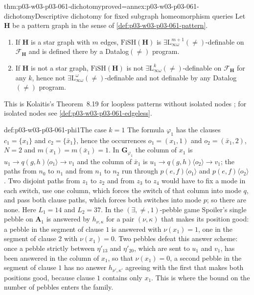 \begin{hbtheorem}{thm:p03-w03-p03-061-dichotomy}{proved=annex:p03-w03-p03-061-dichotomy}{Descriptive dichotomy for fixed subgraph homeomorphism queries}
Let \(\mathbf H\) be a pattern graph in the sense of
\cref{def:p03-w03-p03-061-pattern}.
\begin{enumerate}
\item If \(\mathbf H\) is a star graph with \(m\) edges,
      \(\mathrm{FiSH}(\mathbf H)\) is
      \(\exists\mathrm L^{m+1}_{\infty\omega}(\neq)\)-definable on
      \(\mathcal F_{\mathbf H}\) and is defined there by a Datalog\((\neq)\)
      program.
\item If \(\mathbf H\) is not a star graph, \(\mathrm{FiSH}(\mathbf H)\) is
      not \(\exists\mathrm L^k_{\infty\omega}(\neq)\)-definable on
      \(\mathcal F_{\mathbf H}\) for any \(k\), hence not
      \(\exists\mathrm L^\omega_{\infty\omega}(\neq)\)-definable and not
      definable by any Datalog\((\neq)\) program.
\end{enumerate}
\end{hbtheorem}

This is Kolaitis's Theorem~8.19 for loopless patterns without isolated
nodes \cite[Thm~8.19, p.~79]{Kolaitis2003ExpressivePowerNotes}; for
isolated nodes see \cref{def:p03-w03-p03-061-edgeless}.

\begin{hbexample}{def:p03-w03-p03-061-phi1}{The case \(k=1\)}
The formula \(\varphi_1\) has the clauses \(c_1=\{x_1\}\) and
\(c_2=\{\bar x_1\}\), hence the occurrences \(o_1=(x_1,1)\) and
\(o_2=(\bar x_1,2)\), \(N=2\) and \(m(x_1)=m(\bar x_1)=1\). In
\(\mathbf G_{\varphi_1}\) the column of \(x_1\) is
\(u_1\to q(g,h)\langle o_1\rangle\to v_1\) and the column of \(\bar x_1\) is
\(u_1\to q(g,h)\langle o_2\rangle\to v_1\); the paths from \(n_0\) to \(n_1\)
and from \(n_1\) to \(n_2\) run through \(p(e,f)\langle o_1\rangle\) and
\(p(e,f)\langle o_2\rangle\). Two disjoint paths from \(z_1\) to \(z_2\) and
from \(z_3\) to \(z_4\) would have to fix a mode in each switch, use one
column, which forces the switch of that column into mode \(q\), and pass both
clause paths, which forces both switches into mode \(p\); so there are none.
Here \(L_1=14\) and \(L_2=37\). In the \((\exists,\neq,1)\)-pebble game
Spoiler's single pebble on \(\mathbf A_1\) is answered by
\(h_{\nu,\kappa}\) for a pair \((\nu,\kappa)\) that makes its position good:
a pebble in the segment of clause \(1\) is answered with \(\nu(x_1)=1\), one in
the segment of clause \(2\) with \(\nu(x_1)=0\). Two pebbles defeat this
answer scheme: once a pebble strictly between \(\eta'_{13}\) and
\(\eta'_{20}\), which are sent to \(u_1\) and \(v_1\), has been answered in the
column of \(x_1\), so that \(\nu(x_1)=0\), a second pebble in the segment of
clause \(1\) has no answer \(h_{\nu',\kappa'}\) agreeing with the first that
makes both positions good, because clause \(1\) contains only \(x_1\). This
is where the bound on the number of pebbles enters the family.
\end{hbexample}

